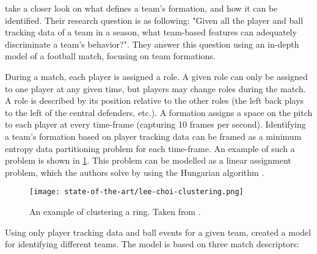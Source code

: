 \citet{bib:bialkowski-lucey-carr-yue-sridharan-matthews-2014} take a closer look on what defines a team's formation, and how it can be identified. Their research question is as following: "Given all the player and ball tracking data of a team in a season, what team-based features can adequately discriminate a team’s behavior?". They answer this question using an in-depth model of a football match, focusing on team formations.

During a match, each player is assigned a role. A given role can only be assigned to one player at any given time, but players may change roles during the match. A role is described by its position relative to the other roles (the left back plays to the left of the central defenders, etc.). A formation assigns a space on the pitch to each player at every time-frame (capturing 10 frames per second). Identifying a team's formation based on player tracking data can be framed as a minimum entropy data partitioning problem \citep{bib:bialkowski-lucey-carr-yue-sridharan-matthews-2014} for each time-frame. An example of such a problem is shown in \cref{fig:lee-choi-clustering}. This problem can be modelled as a linear assignment problem, which the authors solve by using the Hungarian algorithm \citep{bib:kuhn-1955}.

\begin{figure}
    \centering
    \texttt{[image: state-of-the-art/lee-choi-clustering.png]}
    \caption{An example of clustering a ring. Taken from \citet{bib:lee-choi-2004}.}
    \label{fig:lee-choi-clustering}
\end{figure}

Using only player tracking data and ball events for a given team, \citet{bib:bialkowski-lucey-carr-yue-sridharan-matthews-2014} created a model for identifying different teams. The model is based on three match descriptors:

